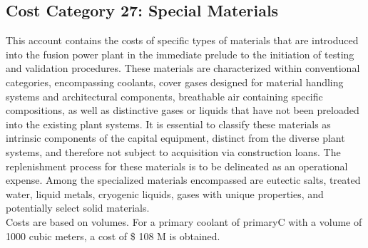 \subsection{Cost Category 27: Special Materials}

This account contains the costs of specific types of materials that are introduced into the fusion power plant in the immediate prelude to the initiation of 
testing and validation procedures. These materials are characterized within conventional categories, encompassing coolants, cover gases 
designed for material handling systems and architectural components, breathable air containing specific compositions, as well as distinctive 
gases or liquids that have not been preloaded into the existing plant systems. It is essential to classify these materials as intrinsic components of the 
capital equipment, distinct from the diverse plant systems, and therefore not subject to acquisition via construction loans. The replenishment process for 
these materials is to be delineated as an operational expense. Among the specialized materials encompassed are eutectic salts, treated water, liquid metals, 
cryogenic liquids, gases with unique properties, and potentially select solid materials. \\

Costs are based on volumes. For a primary coolant of primaryC with a volume of 1000 cubic meters, a cost of \$ 108 M is obtained.


